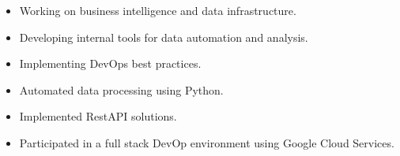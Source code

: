 \documentclass[10pt,a4paper,ragged2e,withhyper]{altacv}
\begin{document}
\begin{paracol}{2}
\begin{itemize}
  \item Working on business intelligence and data infrastructure.
  \item Developing internal tools for data automation and analysis.
  \item Implementing DevOps best practices.
\end{itemize}

\begin{itemize}
  \item Automated data processing using Python.
  \item Implemented RestAPI solutions.
  \item Participated in a full stack DevOp environment using Google Cloud Services.
\end{itemize}

\scriptsize
{}


\end{paracol}
\end{document}
